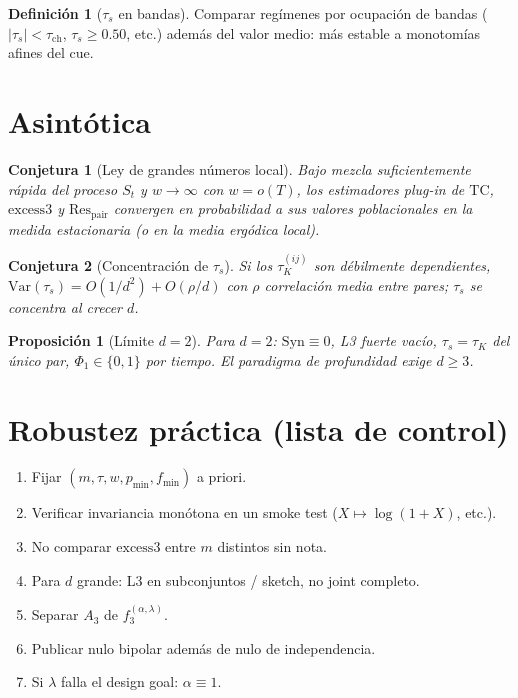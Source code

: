 \documentclass[11pt,a4paper]{article}
\theoremstyle{definition}
\newtheorem{definition}{Definici\'on}[section]
\theoremstyle{plain}
\newtheorem{proposition}{Proposici\'on}[section]
\newtheorem{conjecture}{Conjetura}[section]
\theoremstyle{remark}
\newcommand{\Res}{\mathrm{Res}}
\newcommand{\TC}{\mathrm{TC}}
\newcommand{\Syn}{\mathrm{Syn}}
\newcommand{\excess}{\mathrm{excess3}}
\newcommand{\ts}{\tau_s}
\begin{document}
\begin{definition}[$\ts$ en bandas]
\label{def:bands}
Comparar regímenes por ocupaci\'on de bandas
($|\ts|<\tau_{\mathrm{ch}}$, $\ts\ge 0.50$, etc.) adem\'as del valor
medio: m\'as estable a monotom\'ias afines del cue.
\end{definition}

\section{Asint\'otica}
\label{sec:asymp}

\begin{conjecture}[Ley de grandes n\'umeros local]
\label{conj:lln}
Bajo mezcla suficientemente r\'apida del proceso $S_t$ y $w\to\infty$
con $w=o(T)$, los estimadores plug-in de $\TC$, $\excess$ y
$\Res_{\mathrm{pair}}$ convergen en probabilidad a sus valores
poblacionales en la medida estacionaria (o en la media erg\'odica
local).
\end{conjecture}

\begin{conjecture}[Concentraci\'on de $\ts$]
\label{conj:conc_tau}
Si los $\tau_K^{(ij)}$ son d\'ebilmente dependientes,
$\mathrm{Var}(\ts)=O(1/d^2)+O(\rho/d)$ con $\rho$ correlaci\'on media
entre pares; $\ts$ se concentra al crecer $d$.
\end{conjecture}

\begin{proposition}[L\'imite $d=2$]
\label{prop:d2}
Para $d=2$: $\Syn\equiv 0$, L3 fuerte vac\'io, $\ts=\tau_K$ del \'unico
par, $\Phi_1\in\{0,1\}$ por tiempo. El paradigma de profundidad exige
$d\ge 3$.
\end{proposition}

\section{Robustez pr\'actica (lista de control)}
\label{sec:checklist}

\begin{enumerate}[label=\textbf{R\arabic*.}]
  \item Fijar $(m,\tau,w,p_{\min},f_{\min})$ a priori.
  \item Verificar invariancia mon\'otona en un smoke test
  ($X\mapsto\log(1+X)$, etc.).
  \item No comparar $\excess$ entre $m$ distintos sin nota.
  \item Para $d$ grande: L3 en subconjuntos / sketch, no joint completo.
  \item Separar $A_3$ de $f_3^{(\alpha,\lambda)}$.
  \item Publicar nulo bipolar adem\'as de nulo de independencia.
  \item Si $\lambda$ falla el design goal: $\alpha\equiv 1$.
\end{enumerate}
\end{document}
